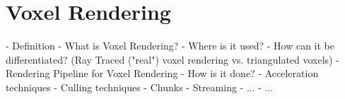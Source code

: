 \chapter{Voxel Rendering} \label{cpt-voxel-rendering}






- Definition
    - What is Voxel Rendering?
    - Where is it used? 
    - How can it be differentiated? (Ray Traced ("real") voxel rendering vs. triangulated voxels)
- Rendering Pipeline for Voxel Rendering
    - How is it done?
- Acceleration techniques
    - Culling techniques
    - Chunks
    - Streaming
    - ...
- ...

